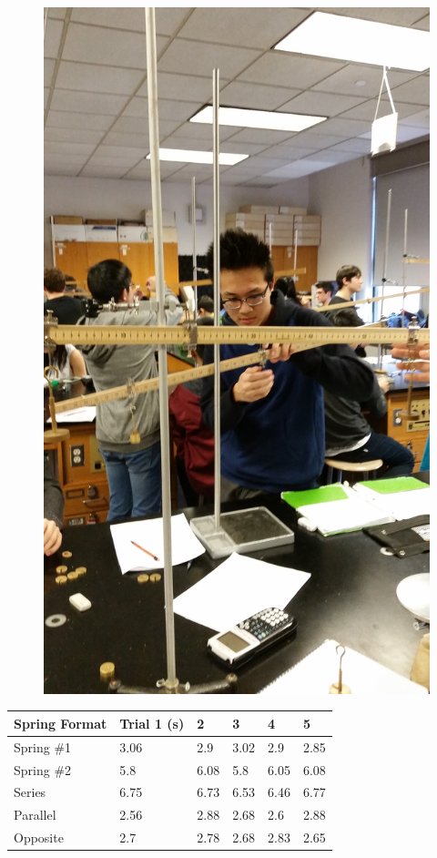 \documentclass[11pt, titlepage]{article}
\begin{document}
\begin{figure}[p]
\centering
\hspace*{-10.5cm}
\includegraphics[scale=0.15, angle=270]{lab4.jpg}
\vspace*{19cm}
\end{figure}

\begin{center}
\begin{tabular}
{|m{5em}|m{5em}|m{5em}|m{5em}|m{5em}|m{5em}|}
\hline
Spring Format & Trial 1 (s) & 2 & 3 & 4 & 5 \\
\hline
Spring \#1 & 3.06 & 2.9 & 3.02 & 2.9 & 2.85 \\
\hline
Spring \#2 & 5.8 & 6.08 & 5.8 & 6.05 & 6.08 \\
\hline
Series & 6.75 & 6.73 & 6.53 & 6.46 & 6.77 \\
\hline
Parallel & 2.56 & 2.88 & 2.68 & 2.6 & 2.88 \\
\hline
Opposite & 2.7 & 2.78 & 2.68 & 2.83 & 2.65 \\
\hline
\end{tabular}
\end{center}
\end{document}
